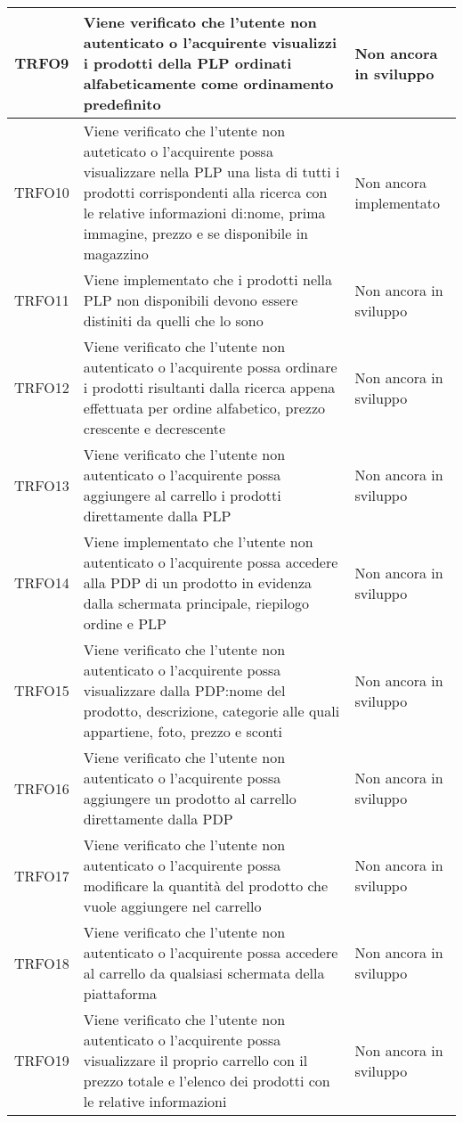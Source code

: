 \begin{longtable}{|c| C{10cm} |C{3cm}|}
	TRFO9 & Viene verificato che l'utente non autenticato o l'acquirente visualizzi i prodotti della PLP ordinati alfabeticamente come ordinamento predefinito & Non ancora in sviluppo\\ \hline
	TRFO10 & Viene verificato che l'utente non auteticato o l'acquirente possa visualizzare nella PLP una lista di tutti i prodotti corrispondenti alla ricerca con le relative informazioni di:nome, prima immagine, prezzo e se disponibile in magazzino & Non ancora 		 implementato \\ \hline
	TRFO11 & Viene implementato che i prodotti nella PLP non disponibili devono essere distiniti da quelli che lo sono & Non ancora in sviluppo \\ \hline
	TRFO12 & Viene verificato che l'utente non autenticato o l'acquirente possa ordinare i prodotti risultanti dalla ricerca appena effettuata per ordine alfabetico, prezzo crescente e decrescente & Non ancora in sviluppo \\ \hline
	TRFO13 & Viene verificato che l'utente non autenticato o l'acquirente possa aggiungere al carrello i prodotti direttamente dalla PLP & Non ancora in sviluppo\\ \hline
	TRFO14 & Viene implementato che l'utente non autenticato o l'acquirente possa accedere alla PDP di un prodotto in evidenza dalla schermata principale, riepilogo ordine e PLP & Non ancora in sviluppo \\ \hline
	TRFO15 & Viene verificato che l'utente non autenticato o l'acquirente possa visualizzare dalla PDP:nome del prodotto, descrizione, categorie alle quali appartiene, foto, prezzo e sconti & Non ancora in sviluppo \\ \hline
	TRFO16 & Viene verificato che l'utente non autenticato o l'acquirente possa aggiungere un prodotto al carrello direttamente dalla PDP  & Non ancora in sviluppo\\ \hline
	TRFO17 & Viene verificato che l'utente non autenticato o l'acquirente possa modificare la quantità del prodotto che vuole aggiungere nel carrello & Non ancora in sviluppo\\ \hline
	TRFO18 & Viene verificato che l'utente non autenticato o l'acquirente possa accedere al carrello da qualsiasi schermata della piattaforma & Non ancora in sviluppo \\ \hline
           TRFO19 & Viene verificato che l'utente non autenticato o l'acquirente possa visualizzare il proprio carrello con il prezzo totale e l'elenco dei prodotti con le relative informazioni & Non ancora in sviluppo\\ \hline

\end{longtable}
